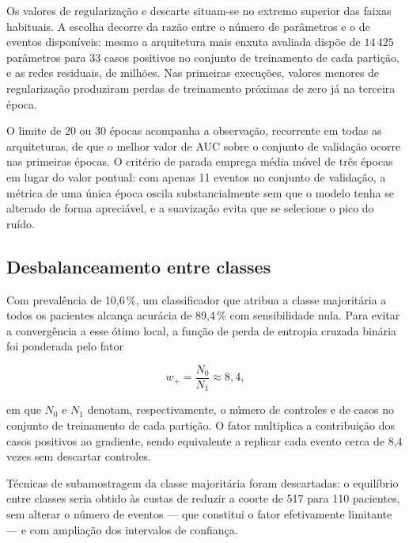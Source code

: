 
Os valores de regularização e descarte situam-se no extremo superior das
faixas habituais. A escolha decorre da razão entre o número de parâmetros e
o de eventos disponíveis: mesmo a arquitetura mais enxuta avaliada dispõe de
$14\,425$ parâmetros para 33 casos positivos no conjunto de treinamento de
cada partição, e as redes residuais, de milhões. Nas primeiras execuções,
valores menores de regularização produziram perdas de treinamento próximas
de zero já na terceira época.

O limite de 20 ou 30 épocas acompanha a observação, recorrente em todas as
arquiteturas, de que o melhor valor de \gls{AUC} sobre o conjunto de
validação ocorre nas primeiras épocas. O critério de parada emprega média
móvel de três épocas em lugar do valor pontual: com apenas 11 eventos no
conjunto de validação, a métrica de uma única época oscila substancialmente
sem que o modelo tenha se alterado de forma apreciável, e a suavização evita
que se selecione o pico do ruído.

\subsection{Desbalanceamento entre classes}
\label{subsec:config-desbalanceamento}

Com prevalência de 10,6\,\%, um classificador que atribua a classe
majoritária a todos os pacientes alcança acurácia de 89,4\,\% com
sensibilidade nula. Para evitar a convergência a esse ótimo local, a função
de perda de entropia cruzada binária foi ponderada pelo fator

\begin{equation}
	w_{+} = \frac{N_0}{N_1} \approx 8{,}4,
	\label{eq:pos-weight}
\end{equation}

\noindent
em que $N_0$ e $N_1$ denotam, respectivamente, o número de controles e de
casos no conjunto de treinamento de cada partição. O fator multiplica a
contribuição dos casos positivos ao gradiente, sendo equivalente a replicar
cada evento cerca de 8,4 vezes sem descartar controles.

Técnicas de subamostragem da classe majoritária foram descartadas: o
equilíbrio entre classes seria obtido às custas de reduzir a coorte de 517
para 110 pacientes, sem alterar o número de eventos --- que constitui o
fator efetivamente limitante --- e com ampliação dos intervalos de confiança.


